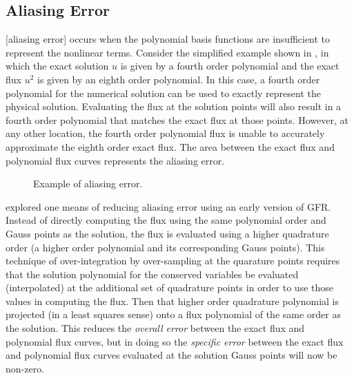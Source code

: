 \subsection{Aliasing Error}
\label{SEC:Aliasing}


[aliasing error] occurs when the polynomial basis
functions are insufficient to represent the nonlinear terms.
%
Consider the simplified example shown in ,
in which the exact solution $u$ is given by a fourth order polynomial
and the exact flux $u^2$ is given by an eighth order polynomial.
%
In this case, a fourth order polynomial for the numerical solution
can be used to exactly represent the physical solution.
%
Evaluating the flux at the solution points will also result in a
fourth order polynomial that matches the exact flux at those points.
%
However, at any other location, the fourth order polynomial flux
is unable to accurately approximate the eighth order exact flux.
%
The area between the exact flux and polynomial flux curves represents
the aliasing error.


\begin{figure}[htb]
  \begin{centering}
    \caption{Example of aliasing error.}
    \label{FIG:Aliasing}
  \end{centering}
\end{figure}


explored one means of reducing aliasing error
using an early version of GFR.
%
Instead of directly computing the flux using the same polynomial
order and Gauss points as the solution, the flux is evaluated
using a higher quadrature order
(\thatis a higher order polynomial and its corresponding Gauss points).
%
This technique of over-integration by over-sampling at the quarature points
requires that the solution polynomial for the conserved variables
be evaluated (\thatis interpolated) at the additional set of quadrature points
in order to use those values in computing the flux.
%
Then that higher order quadrature polynomial is projected
(in a least squares sense) onto a flux polynomial of the same order
as the solution.
%
This reduces the {\em overall error} between the exact flux and
polynomial flux curves, but in doing so the {\em specific error}
between the exact flux and polynomial flux curves evaluated at the
solution Gauss points will now be non-zero.

